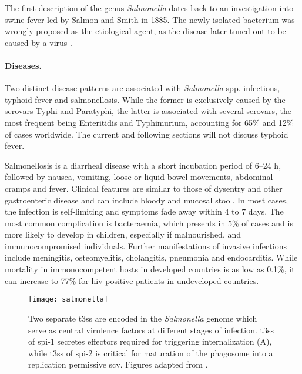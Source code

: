 The first description of the genus \textit{Salmonella} dates back to an investigation into swine fever led by Salmon and Smith in 1885. The newly isolated bacterium was wrongly proposed as the etiological agent, as the disease later tuned out to be caused by a virus \citep{Fabrega2013,Haraga2008}.

\paragraph{Diseases.}
Two distinct disease patterns are associated with \textit{Salmonella} spp. infections, typhoid fever and salmonellosis. While the former is exclusively caused by the serovars Typhi and Paratyphi, the latter is associated with several serovars, the most frequent being Enteritidis and Typhimurium, accounting for 65\% and 12\% of cases worldwide. The current and following sections will not discuss typhoid fever.

Salmonellosis is a diarrheal disease with a short incubation period of 6--24 h, followed by nausea, vomiting, loose or liquid bowel movements, abdominal cramps and fever. Clinical features are similar to those of dysentry and other gastroenteric disease and can include bloody and mucosal stool. In most cases, the infection is self-limiting and symptoms fade away within 4 to 7 days. The most common complication is bacteraemia, which presents in 5\% of cases and is more likely to develop in children, especially if malnourished, and immunocompromised individuals. Further manifestations of invasive infections include meningitis, osteomyelitis, cholangitis, pneumonia and endocarditis. While mortality in immonocompetent hosts in developed countries is as low as 0.1\%, it can increase to 77\% for \gls{hiv} positive patients in undeveloped countries.

\begin{figure}[t]
  \centering
  \texttt{[image: salmonella]}
  \caption[Overview of mechanisms for infection of epithelial cells by \textit{Salmonella} and establishing an intracellular replicatory niche.]{Two separate \gls{t3ss} are encoded in the \textit{Salmonella} genome which serve as central virulence factors at different stages of infection. \Gls{t3ss} of \acrshort{spi}-1 secretes effectors required for triggering internalization (A), while \gls{t3ss} of \acrshort{spi}-2 is critical for maturation of the phagosome into a replication permissive \gls{scv}. Figures adapted from \cite{Haraga2008}.}
  \label{fig:salmonella}
\end{figure}

